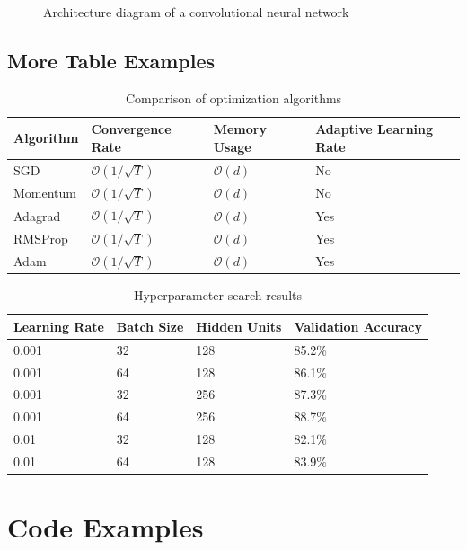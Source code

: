\documentclass{article}
\begin{document}
\begin{figure}[h]
\centering
\fbox{\rule[-.5cm]{0cm}{4cm} \rule[-.5cm]{4cm}{0cm}}
\caption{Architecture diagram of a convolutional neural network}
\label{fig:cnn_arch}
\end{figure}

\subsection{More Table Examples}

\begin{table}[h]
\caption{Comparison of optimization algorithms}
\label{tab:opt_comparison}
\centering
\begin{tabular}{@{}llll@{}}
\toprule
Algorithm & Convergence Rate & Memory Usage & Adaptive Learning Rate \\
\midrule
SGD & $\mathcal{O}(1/\sqrt{T})$ & $\mathcal{O}(d)$ & No \\
Momentum & $\mathcal{O}(1/\sqrt{T})$ & $\mathcal{O}(d)$ & No \\
Adagrad & $\mathcal{O}(1/\sqrt{T})$ & $\mathcal{O}(d)$ & Yes \\
RMSProp & $\mathcal{O}(1/\sqrt{T})$ & $\mathcal{O}(d)$ & Yes \\
Adam & $\mathcal{O}(1/\sqrt{T})$ & $\mathcal{O}(d)$ & Yes \\
\bottomrule
\end{tabular}
\end{table}

\begin{table}[h]
\caption{Hyperparameter search results}
\label{tab:hyperparams}
\centering
\begin{tabular}{@{}llll@{}}
\toprule
Learning Rate & Batch Size & Hidden Units & Validation Accuracy \\
\midrule
0.001 & 32 & 128 & 85.2\% \\
0.001 & 64 & 128 & 86.1\% \\
0.001 & 32 & 256 & 87.3\% \\
0.001 & 64 & 256 & 88.7\% \\
0.01 & 32 & 128 & 82.1\% \\
0.01 & 64 & 128 & 83.9\% \\
\bottomrule
\end{tabular}
\end{table}

\section{Code Examples}
\end{document}
